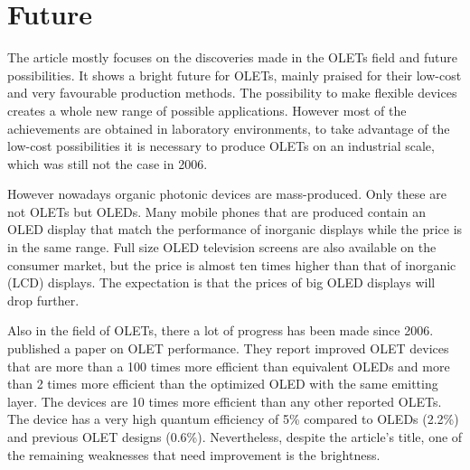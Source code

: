 \section{Future}\label{sec:future}
The article mostly focuses on the discoveries made in the OLETs field and future possibilities. It shows a bright future for OLETs, mainly praised for their low-cost and very favourable production methods. The possibility to make flexible devices creates a whole new range of possible applications. However most of the achievements are obtained in laboratory environments, to take advantage of the low-cost possibilities it is necessary to produce OLETs on an industrial scale, which was still not the case in 2006.

However nowadays organic photonic devices are mass-produced. Only these are not OLETs but OLEDs. Many mobile phones that are produced contain an OLED display that match the performance of inorganic displays while the price is in the same range. Full size OLED television screens are also available on the consumer market, but the price is almost ten times higher than that of inorganic (LCD) displays. The expectation is that the prices of big OLED displays will drop further. 

Also in the field of OLETs, there a lot of progress has been made since 2006. \citet{Capelli} published a paper on OLET performance. They report improved OLET devices that are more than a 100 times more efficient than equivalent OLEDs and more than 2 times more efficient than the optimized OLED with the same emitting layer. The devices are 10 times more efficient than any other reported OLETs. The device has a very high quantum efficiency of 5\% compared to OLEDs (2.2\%) and previous OLET designs (0.6\%). Nevertheless, despite the article's title, one of the remaining weaknesses that need improvement is the brightness.
